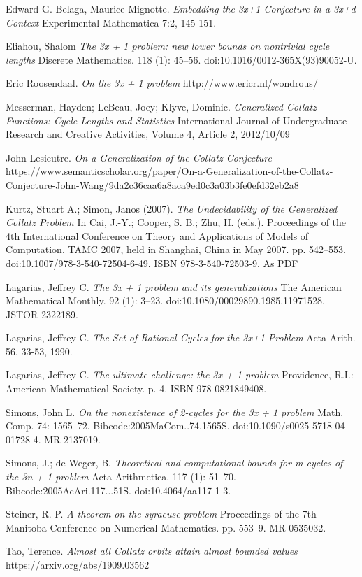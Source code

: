 \documentclass[12pt]{article} %
\begin{document}
\begin{thebibliography}{9}

Edward G. Belaga, Maurice Mignotte.
\textit{Embedding the 3x+1 Conjecture in a 3x+d Context}
Experimental Mathematica 7:2, 145-151.

Eliahou, Shalom
\textit{The 3x + 1 problem: new lower bounds on nontrivial cycle lengths}
Discrete Mathematics. 118 (1): 45–56. doi:10.1016/0012-365X(93)90052-U.

Eric Roosendaal.
\textit{On the 3x + 1 problem}
http://www.ericr.nl/wondrous/

Messerman, Hayden; LeBeau, Joey; Klyve, Dominic.
\textit{Generalized Collatz Functions: Cycle Lengths and Statistics}
International Journal of Undergraduate Research and Creative Activities, Volume 4, Article 2, 2012/10/09

John Lesieutre.
\textit{On a Generalization of the Collatz Conjecture}
https://www.semanticscholar.org/paper/On-a-Generalization-of-the-Collatz-Conjecture-John-Wang/9da2c36caa6a8aca9ed0c3a03b3fe0efd32eb2a8

Kurtz, Stuart A.; Simon, Janos (2007). 
\textit{The Undecidability of the Generalized Collatz Problem}
In Cai, J.-Y.; Cooper, S. B.; Zhu, H. (eds.). Proceedings of the 4th International Conference on Theory and Applications of Models of Computation, TAMC 2007, held in Shanghai, China in May 2007. pp. 542–553. doi:10.1007/978-3-540-72504-6-49. ISBN 978-3-540-72503-9. As PDF

Lagarias, Jeffrey C.
\textit{The 3x + 1 problem and its generalizations}
The American Mathematical Monthly. 92 (1): 3–23. doi:10.1080/00029890.1985.11971528. JSTOR 2322189.

Lagarias, Jeffrey C.
\textit{The Set of Rational Cycles for the 3x+1 Problem}
Acta Arith. 56, 33-53, 1990.

Lagarias, Jeffrey C.
\textit{The ultimate challenge: the 3x + 1 problem}
Providence, R.I.: American Mathematical Society. p. 4. ISBN 978-0821849408.

Simons, John L. 
\textit{On the nonexistence of 2-cycles for the 3x + 1 problem}
Math. Comp. 74: 1565–72. Bibcode:2005MaCom..74.1565S. doi:10.1090/s0025-5718-04-01728-4. MR 2137019.
 
 Simons, J.; de Weger, B. 
 \textit{Theoretical and computational bounds for m-cycles of the 3n + 1 problem}
 Acta Arithmetica. 117 (1): 51–70. Bibcode:2005AcAri.117...51S. doi:10.4064/aa117-1-3.

Steiner, R. P. 
\textit{A theorem on the syracuse problem}
Proceedings of the 7th Manitoba Conference on Numerical Mathematics. pp. 553–9. MR 0535032.
 
Tao, Terence.
\textit{Almost all Collatz orbits attain almost bounded values}
https://arxiv.org/abs/1909.03562 
\end{thebibliography}
\end{document}

